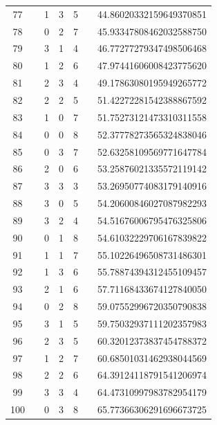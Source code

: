 \documentclass{article}
\begin{document}
\begin{table}[htbp]
\begin{tabular}{c|c|c|c|c|c|c}
77 &   & 1 & 3 & 5 &   & 44.86020332159649370851 \\
78 &   & 0 & 2 & 7 &   & 45.93347808462032588750 \\
79 &   & 3 & 1 & 4 &   & 46.77277279347498506468 \\
80 &   & 1 & 2 & 6 &   & 47.97441606008423775620 \\
81 &   & 2 & 3 & 4 &   & 49.17863080195949265772 \\
82 &   & 2 & 2 & 5 &   & 51.42272281542388867592 \\
83 &   & 1 & 0 & 7 &   & 51.75273121473310311558 \\
84 &   & 0 & 0 & 8 &   & 52.37778273565324838046 \\
85 &   & 0 & 3 & 7 &   & 52.63258109569771647784 \\
86 &   & 2 & 0 & 6 &   & 53.25876021335572119142 \\
87 &   & 3 & 3 & 3 &   & 53.26950774083179140916 \\
88 &   & 3 & 0 & 5 &   & 54.20600846027087982293 \\
89 &   & 3 & 2 & 4 &   & 54.51676006795476325806 \\
90 &   & 0 & 1 & 8 &   & 54.61032229706167839822 \\
91 &   & 1 & 1 & 7 &   & 55.10226496508731486301 \\
92 &   & 1 & 3 & 6 &   & 55.78874394312455109457 \\
93 &   & 2 & 1 & 6 &   & 57.71168433674127840050 \\
94 &   & 0 & 2 & 8 &   & 59.07552996720350790838 \\
95 &   & 3 & 1 & 5 &   & 59.75032937111202357983 \\
96 &   & 2 & 3 & 5 &   & 60.32012373837454788372 \\
97 &   & 1 & 2 & 7 &   & 60.68501031462938044569 \\
98 &   & 2 & 2 & 6 &   & 64.39124118791541206974 \\
99 &   & 3 & 3 & 4 &   & 64.47310997983782954179 \\
100 &   & 0 & 3 & 8 &   & 65.77366306291696673725 \\
\bottomrule
\end{tabular}
\end{table}
\end{document}
